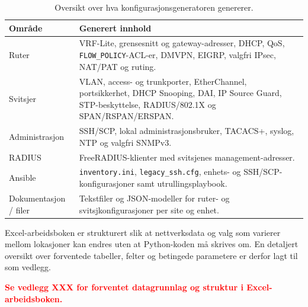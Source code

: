 \begin{table}[H]
    \centering
    \caption{Oversikt over hva konfigurasjonsgeneratoren genererer.}
    \label{tab:generator-output}
    \small
    \renewcommand{\arraystretch}{1.35}
    \setlength{\tabcolsep}{5pt}
    \begin{tabular}{
        >{\raggedright\arraybackslash}p{2.8cm}
        >{\raggedright\arraybackslash}p{12cm}
    }
        \toprule
        \rowcolor{tablegreen}
        \color{white}\textbf{Område} &
        \color{white}\textbf{Generert innhold} \\
        \midrule

        Ruter &
        VRF-Lite, grensesnitt og gateway-adresser, DHCP, QoS, \texttt{FLOW\_POLICY}-ACL-er, DMVPN, EIGRP, valgfri IPsec, NAT/PAT og ruting. \\
        \addlinespace[2pt]

        Svitsjer &
        VLAN, access- og trunkporter, EtherChannel, portsikkerhet, DHCP Snooping, DAI, IP Source Guard, STP-beskyttelse, RADIUS/802.1X og SPAN/RSPAN/ERSPAN. \\
        \addlinespace[2pt]

        Administrasjon &
        SSH/SCP, lokal administrasjonsbruker, TACACS+, syslog, NTP og valgfri SNMPv3. \\
        \addlinespace[2pt]

        RADIUS &
        FreeRADIUS-klienter med svitsjenes management-adresser. \\
        \addlinespace[2pt]

        Ansible &
        \texttt{inventory.ini}, \texttt{legacy\_ssh.cfg}, enhets- og SSH/SCP-konfigurasjoner samt utrullingsplaybook. \\
        \addlinespace[2pt]

        Dokumentasjon / filer &
        Tekstfiler og JSON-modeller for ruter- og svitsjkonfigurasjoner per site og enhet. \\

        \bottomrule
    \end{tabular}
\end{table}

Excel-arbeidsboken er strukturert slik at nettverksdata og valg som varierer mellom lokasjoner kan endres uten at Python-koden må skrives om. En detaljert oversikt over forventede tabeller, felter og betingede parametere er derfor lagt til som vedlegg.

\textcolor{red}{\textbf{Se vedlegg XXX for forventet datagrunnlag og struktur i Excel-arbeidsboken.}}


